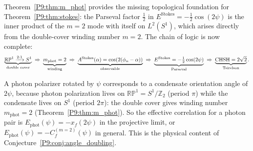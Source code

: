 \begin{remark}
\label{P9:rem:stokes_connection}
Theorem~\ref{P9:thm:m_phot} provides the missing topological foundation for
Theorem~\ref{P9:thm:stokes}:
the Parseval factor $\tfrac{1}{2}$ in $E^\mathrm{Stokes}=-\tfrac{1}{2}\cos(2\psi)$
is the inner product of the $m=2$ mode with itself on $L^2(S^1)$,
which arises directly from the double-cover winding number $m=2$.
The chain of logic is now complete:
\begin{equation}
  \underbrace{\mathbb{RP}^1 \xrightarrow{2:1} S^1}_{\text{double cover}}
  \;\Rightarrow\;
  \underbrace{m_\mathrm{phot}=2}_{\text{winding}}
  \;\Rightarrow\;
  \underbrace{A^\mathrm{Stokes}(\alpha)=\cos(2(\phi_n-\alpha))}_{\text{observable}}
  \;\Rightarrow\;
  \underbrace{E^\mathrm{Stokes}=-\tfrac{1}{2}\cos(2\psi)}_{\text{Parseval}}
  \;\Rightarrow\;
  \underbrace{\mathrm{CHSH}=2\sqrt{2}}_{\text{Tsirelson}}.
\end{equation}
\end{remark}

\begin{remark}
\label{P9:rem:winding}
A photon polarizer rotated by $\psi$ corresponds to a condensate
orientation angle of $2\psi$, because photon polarization lives on
$\mathbb{RP}^1 = S^1/\mathbb{Z}_2$ (period $\pi$) while the condensate
lives on $S^1$ (period $2\pi$): the double cover gives winding number
$m_\mathrm{phot}=2$ (Theorem~\ref{P9:thm:m_phot}).
So the effective correlation for a photon pair is
$E_\mathrm{phot}(\psi) = -x_f(2\psi)$ in the projective limit,
or $E_\mathrm{phot}(\psi) = -C_f^{(m=2)}(\psi)$ in general.
This is the physical content of Conjecture~\ref{P9:conj:angle_doubling}.
\end{remark}

